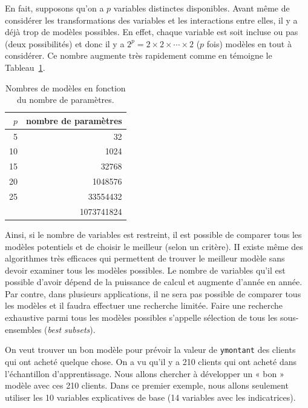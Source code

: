 \documentclass[
  11pt,
  letterpaper,
]{book}
\theoremstyle{definition}
\theoremstyle{remark}
\begin{document}
En fait, supposons qu'on a \(p\) variables distinctes disponibles. Avant
même de considérer les transformations des variables et les interactions
entre elles, il y a déjà trop de modèles possibles. En effet, chaque
variable est soit incluse ou pas (deux possibilités) et donc il y a
\(2^p=2\times 2 \times \cdots \times 2\) (\(p\) fois) modèles en tout à
considérer. Ce nombre augmente très rapidement comme en témoigne le
Tableau~\ref{tbl-02-table3}.

\hypertarget{tbl-02-table3}{}
\begin{table}
\caption{\label{tbl-02-table3}Nombres de modèles en fonction du nombre de paramètres. }\tabularnewline

\centering
\begin{tabular}{rr}
\toprule
\(p\) & nombre de paramètres\\
\midrule
5 & 32\\
10 & 1024\\
15 & 32768\\
20 & 1048576\\
25 & 33554432\\
\addlinespace
30 & 1073741824\\
\bottomrule
\end{tabular}
\end{table}

Ainsi, si le nombre de variables est restreint, il est possible de
comparer tous les modèles potentiels et de choisir le meilleur (selon un
critère). II existe même des algorithmes très efficaces qui permettent
de trouver le meilleur modèle sans devoir examiner tous les modèles
possibles. Le nombre de variables qu'il est possible d'avoir dépend de
la puissance de calcul et augmente d'année en année. Par contre, dans
plusieurs applications, il ne sera pas possible de comparer tous les
modèles et il faudra effectuer une recherche limitée. Faire une
recherche exhaustive parmi tous les modèles possibles s'appelle
sélection de tous les sous-ensembles (\emph{best subsets}).

On veut trouver un bon modèle pour prévoir la valeur de
\texttt{ymontant} des clients qui ont acheté quelque chose. On a vu
qu'il y a 210 clients qui ont acheté dans l'échantillon d'apprentissage.
Nous allons chercher à développer un « bon » modèle avec ces 210
clients. Dans ce premier exemple, nous allons seulement utiliser les 10
variables explicatives de base (14 variables avec les indicatrices).
\end{document}
